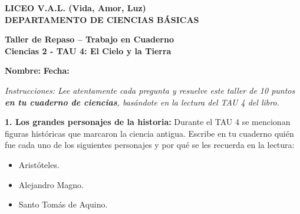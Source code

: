 \documentclass[12pt, letterpaper]{article}
\newif\ifshowanswers
\newcommand{\respAbierta}[2][3cm]{
	\ifshowanswers
	\par\vspace{0.2cm}
	\textbf{\textcolor{blue}{Respuesta:}} \textcolor{blue}{#2}
	\vspace{0.2cm}
	\else
	\par\vspace{#1} %
	\fi
}
\begin{document}
	
	\begin{center}
		{\Large \textbf{\color{valblue} LICEO V.A.L. (Vida, Amor, Luz)}}\\[0.1cm]
		{\large \textbf{DEPARTAMENTO DE CIENCIAS BÁSICAS}}\\[0.1cm]
		\vspace{0.2cm}
		\begin{tcolorbox}[colback=valblue, colframe=valdark, arc=2mm, boxrule=1pt, halign=center]
			{\Large \textbf{\color{white} Taller de Repaso -- Trabajo en Cuaderno}}\\[0.1cm]
			{\large \textbf{\color{yellow!90!white} Ciencias 2 - TAU 4: El Cielo y la Tierra}}
		\end{tcolorbox}
	\end{center}
	
	\vspace{0.3cm}
	\noindent \textbf{Nombre:} \underline{\hspace{8cm}} \hspace{1cm}\textbf{Fecha:} \underline{\hspace{3cm}}
	
	\vspace{0.5cm}
	\begin{tcolorbox}[colback=gray!10!white, colframe=black, arc=1mm]
		\textit{Instrucciones: Lee atentamente cada pregunta y resuelve este taller de 10 puntos \textbf{en tu cuaderno de ciencias}, basándote en la lectura del TAU 4 del libro.}
	\end{tcolorbox}
	
	\vspace{0.5cm}
	
	\noindent \textbf{1. Los grandes personajes de la historia:} Durante el TAU 4 se mencionan figuras históricas que marcaron la ciencia antigua. Escribe en tu cuaderno quién fue cada uno de los siguientes personajes y por qué se les recuerda en la lectura:
	\begin{itemize}[itemsep=0.1cm]
		\item Aristóteles.
		\item Alejandro Magno.
		\item Santo Tomás de Aquino.
	\end{itemize}
	\respAbierta[3.5cm]{Aristóteles fue un filósofo griego que propuso que la Tierra era una esfera inmóvil en el centro del universo. Alejandro Magno fue su alumno y fundó la ciudad de Alejandría (pero murió antes de que se creara la gran biblioteca). Santo Tomás de Aquino integró la filosofía de Aristóteles con la doctrina de la Iglesia Católica al escribir su obra ``Suma Teológica''.}
	
\end{document}
